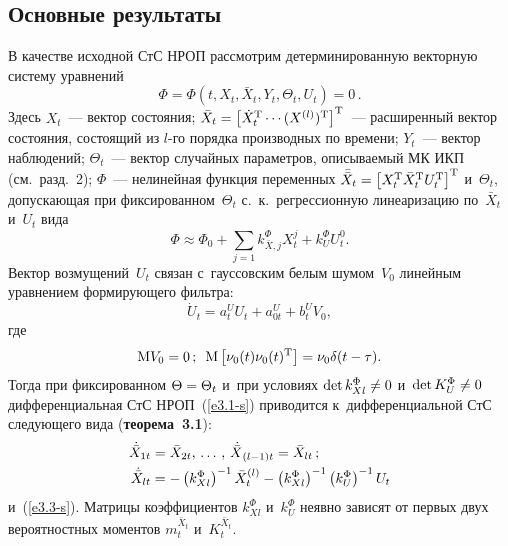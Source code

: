 \begin{multicols}{2}
\section{Основные результаты}


В качестве исходной СтС НРОП рассмотрим детерминированную  векторную сис\-те\-му 
уравнений
  \begin{equation}
  \Phi = \Phi \left( t, X_t, \bar X_t, Y_t, \Theta_t, U_t\right) =0\,.\label{e3.1-s}
  \end{equation}
Здесь $X_t$~--- вектор состояния; $\bar X_t\hm= \lk \dot X_t^{\mathrm{T}} \cdots 
(X^{(l)})^{\mathrm{T}}\rk^{\mathrm{T}}$~--- расширенный вектор состояния, состоящий из $l$-го порядка 
производных по времени; $Y_t$~--- вектор наблюдений; $\Theta_t$~--- вектор 
случайных параметров, описываемый МК ИКП (см.\ разд.~2); $\Phi$~--- нелинейная 
функция переменных  $\bar{\bar X}_t \hm= \lk X_t^{\mathrm{T}} \bar X_t^{\mathrm{T}} U_t^{\mathrm{T}}\rk^{\mathrm{T}}$ и~$\Theta_t$, 
допускающая при фиксированном~$\Theta_t$ с.~к.\ регрессионную 
линеаризацию по~$\bar X_t$  и~$U_t$ вида
    \begin{equation}
    \Phi\approx \Phi_0 + \sum\limits_{j=1} k_{\bar X,j}^\Phi X_t^j + k_U^\Phi 
U_t^0.\label{e3.2-s}
\end{equation}
Вектор возмущений~$U_t$ связан с~гауссовским белым шумом~$V_0$ линейным 
уравнением формирующего фильтра:
\begin{equation}
\dot U_t = a_t^U U_t +  a_{0t}^U + b_t^U V_0,
\label{e3.3-s}
\end{equation}
где 
$$
\mathrm{M} V_0 =0\,;\enskip  \mathrm{M} \left[ \nu_0 (t) \nu_0(t)^{\mathrm{T}}\right] = \nu_0 \delta (t-\tau).
$$ 
Тогда при фиксированном $\Theta\hm=\Theta_t$ и~при условиях $\mathrm{det}\, k_{Xl}^\Phi 
\hm\ne 0$ и~$ \mathrm{det}\, K_U^\Phi\hm\ne 0$ дифференциальная СтС НРОП~(\ref{e3.1-s}) приводится 
к~дифференциальной СтС следующего вида (\textbf{теорема~3.1}):
\begin{align*}
\dot{\bar X}_{1t} &= \bar X_{2t} ,\,\ldots\,,\, {\dot{\bar X}}_{(l-1)t} =\bar 
X_{lt}\,;\\
    \dot{\bar X}_{lt}&= -\left(k_{Xl}^\Phi\right)^{-1} \bar X_t^{(l)}-
\left(k_{Xl}^\Phi\right)^{-1}\left(k_{U}^\Phi\right)^{-1} U_t
\end{align*}
и~(\ref{e3.3-s}). Матрицы коэффициентов $k_{Xl}^\Phi$ и~$k_{U}^\Phi$ неявно зависят от 
первых двух вероятностных моментов $m_t^{\bar X_t}$ и~$K_t^{\bar X_t}$.


\end{multicols}

